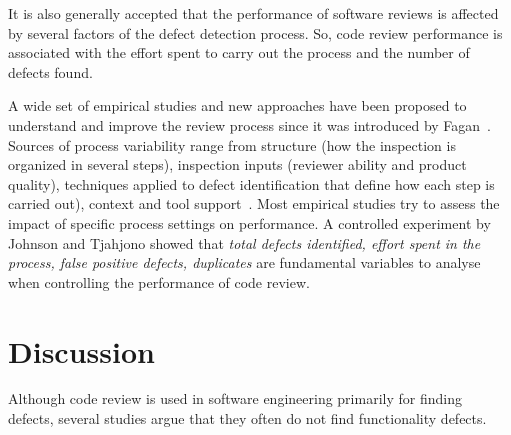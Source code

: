 \documentclass[ifip]{svmult}
\begin{document}
It is also generally accepted that the performance of software reviews is affected by several factors of the 
defect detection process. So, code review performance is associated with the effort spent to carry out the process and the number of 
defects found. 

A wide set of empirical studies and new approaches have been proposed to understand and improve the review process since it 
was introduced by Fagan~\cite{contribution15}. Sources of process variability range from structure (how the inspection is organized in several steps), inspection inputs (reviewer ability and product quality), 
techniques applied to defect identification that define how each step is carried out), 
context and tool support~\cite{contribution16}. Most empirical studies try to assess the impact of specific process settings on performance. 
A controlled experiment by Johnson and Tjahjono \cite{contribution17} showed that \textit{total defects identified, effort spent in the 
process, false positive defects, duplicates} are fundamental variables to analyse when controlling the performance of code review. 

\section{Discussion}
\label{sec:2}



Although code review is used in software engineering primarily for finding defects, several studies argue that they often 
do not find functionality defects.
\end{document}
